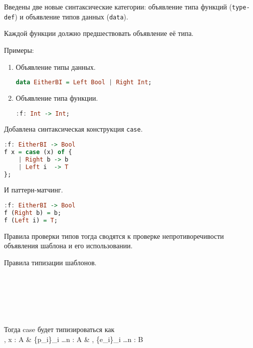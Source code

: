\documentclass[12pt, a4paper] {ncc}
\begin{document}
Введены две новые синтаксические категории: объявление типа функций (\texttt{type-def})
и объявление типов данных (\texttt{data}).

Каждой функции должно предшествовать объявление её типа.

Примеры:
\begin{enumerate}
\item Объявление типы данных.
\begin{lstlisting}[language=Haskell]
data EitherBI = Left Bool | Right Int;
\end{lstlisting}

\item Объявление типа функции.
\begin{lstlisting}[language=Haskell]
:f: Int -> Int;
\end{lstlisting}
\end{enumerate}

Добавлена синтаксическая конструкция \texttt{case}.
\begin{lstlisting}[language=Haskell]
:f: EitherBI -> Bool
f x = case (x) of {
    | Right b -> b
    | Left i  -> T
};
\end{lstlisting}

И паттерн-матчинг.
\begin{lstlisting}[language=Haskell]
:f: EitherBI -> Bool
f (Right b) = b;
f (Left i) = T;
\end{lstlisting}

Правила проверки типов тогда сводятся к проверке непротиворечивости
объявления шаблона и его использовании.

Правила типизации шаблонов.


\ \\

\ \\

\ \\

Тогда case будет типизироваться как \\

 {
	\Gamma, \Delta \vdash x : A &
	\Delta \vdash \{p_i\}_{i  \ldots n} : A &
	\Gamma, \Delta \vdash \{e_i\}_{i  \ldots n} : B
}
\end{document}
